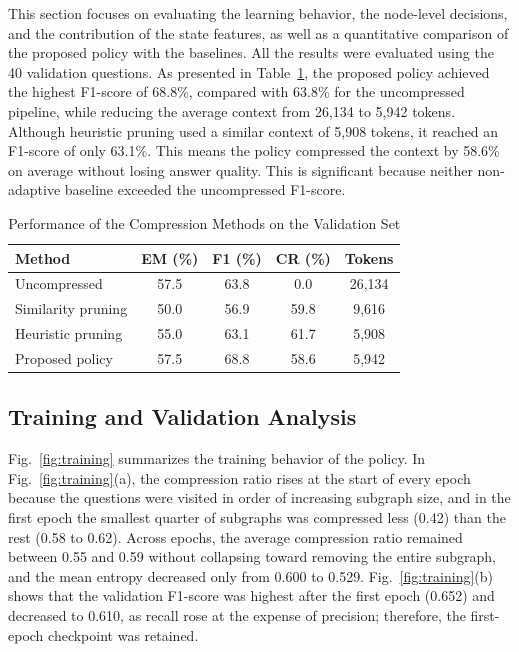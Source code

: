 \documentclass[conference]{IEEEtran}
\begin{document}
This section focuses on evaluating the learning behavior, the node-level decisions, and the contribution of the state features, as well as a quantitative comparison of the proposed policy with the baselines. All the results were evaluated using the 40 validation questions. As presented in Table~\ref{tab:results}, the proposed policy achieved the highest F1-score of 68.8\%, compared with 63.8\% for the uncompressed pipeline, while reducing the average context from 26,134 to 5,942 tokens. Although heuristic pruning used a similar context of 5,908 tokens, it reached an F1-score of only 63.1\%. This means the policy compressed the context by 58.6\% on average without losing answer quality. This is significant because neither non-adaptive baseline exceeded the uncompressed F1-score.

\begin{table}[!t]
\centering
\caption{Performance of the Compression Methods on the Validation Set}
\label{tab:results}
\setlength{\tabcolsep}{4pt}
\begin{tabular}{lcccc}
\toprule
\textbf{Method} & \textbf{EM (\%)} & \textbf{F1 (\%)} & \textbf{CR (\%)} & \textbf{Tokens} \\
\midrule
Uncompressed & 57.5 & 63.8 & 0.0 & 26,134 \\
Similarity pruning & 50.0 & 56.9 & 59.8 & 9,616 \\
Heuristic pruning & 55.0 & 63.1 & 61.7 & 5,908 \\
Proposed policy & 57.5 & 68.8 & 58.6 & 5,942 \\
\bottomrule
\end{tabular}
\end{table}

\subsection{Training and Validation Analysis}
Fig.~\ref{fig:training} summarizes the training behavior of the policy. In Fig.~\ref{fig:training}(a), the compression ratio rises at the start of every epoch because the questions were visited in order of increasing subgraph size, and in the first epoch the smallest quarter of subgraphs was compressed less (0.42) than the rest (0.58 to 0.62). Across epochs, the average compression ratio remained between 0.55 and 0.59 without collapsing toward removing the entire subgraph, and the mean entropy decreased only from 0.600 to 0.529. Fig.~\ref{fig:training}(b) shows that the validation F1-score was highest after the first epoch (0.652) and decreased to 0.610, as recall rose at the expense of precision; therefore, the first-epoch checkpoint was retained.
\end{document}

